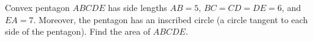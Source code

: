 Convex pentagon $ABCDE$ has side lengths $AB=5$, $BC=CD=DE=6$, and $EA=7$. Moreover, the pentagon has an inscribed circle (a circle tangent to each side of the pentagon). Find the area of $ABCDE$.